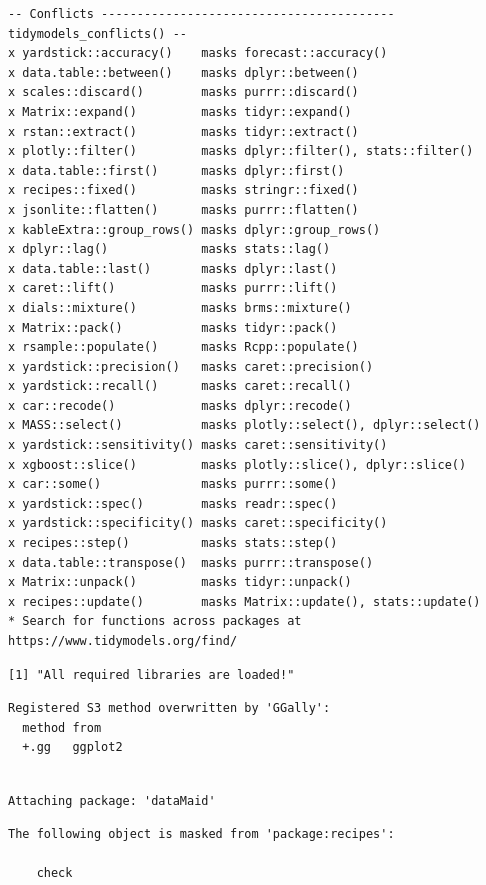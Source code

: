 \documentclass[
  10pt,
]{article}
\begin{document}
\begin{verbatim}
-- Conflicts ----------------------------------------- tidymodels_conflicts() --
x yardstick::accuracy()    masks forecast::accuracy()
x data.table::between()    masks dplyr::between()
x scales::discard()        masks purrr::discard()
x Matrix::expand()         masks tidyr::expand()
x rstan::extract()         masks tidyr::extract()
x plotly::filter()         masks dplyr::filter(), stats::filter()
x data.table::first()      masks dplyr::first()
x recipes::fixed()         masks stringr::fixed()
x jsonlite::flatten()      masks purrr::flatten()
x kableExtra::group_rows() masks dplyr::group_rows()
x dplyr::lag()             masks stats::lag()
x data.table::last()       masks dplyr::last()
x caret::lift()            masks purrr::lift()
x dials::mixture()         masks brms::mixture()
x Matrix::pack()           masks tidyr::pack()
x rsample::populate()      masks Rcpp::populate()
x yardstick::precision()   masks caret::precision()
x yardstick::recall()      masks caret::recall()
x car::recode()            masks dplyr::recode()
x MASS::select()           masks plotly::select(), dplyr::select()
x yardstick::sensitivity() masks caret::sensitivity()
x xgboost::slice()         masks plotly::slice(), dplyr::slice()
x car::some()              masks purrr::some()
x yardstick::spec()        masks readr::spec()
x yardstick::specificity() masks caret::specificity()
x recipes::step()          masks stats::step()
x data.table::transpose()  masks purrr::transpose()
x Matrix::unpack()         masks tidyr::unpack()
x recipes::update()        masks Matrix::update(), stats::update()
* Search for functions across packages at https://www.tidymodels.org/find/
\end{verbatim}

\begin{verbatim}
[1] "All required libraries are loaded!"
\end{verbatim}

\begin{verbatim}
Registered S3 method overwritten by 'GGally':
  method from   
  +.gg   ggplot2
\end{verbatim}

\begin{verbatim}

Attaching package: 'dataMaid'
\end{verbatim}

\begin{verbatim}
The following object is masked from 'package:recipes':

    check
\end{verbatim}
\end{document}
